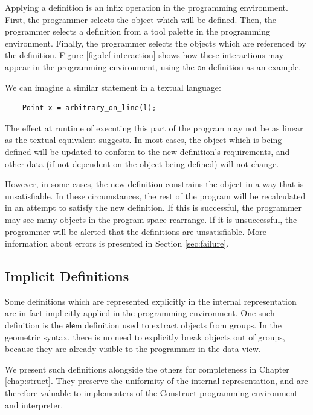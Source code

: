 \documentclass[twoside,11pt]{report}
\begin{document}
Applying a definition is an infix operation in the programming environment. 
First, the programmer selects the object which will be defined. 
Then, the programmer selects a definition from a tool palette in the programming environment. 
Finally, the programmer selects the objects which are referenced by the definition.
Figure \ref{fig:def-interaction} shows how these interactions may appear in the programming environment, using the $\mathsf{on}$ definition as an example.

We can imagine a similar statement in a textual language:

\begin{verbatim}
    Point x = arbitrary_on_line(l);
\end{verbatim}

The effect at runtime of executing this part of the program may not be as linear as the textual equivalent suggests.
In most cases, the object which is being defined will be updated to conform to the new definition's requirements, and other data (if not dependent on the object being defined) will not change.

However, in some cases, the new definition constrains the object in a way that is unsatisfiable. 
In these circumstances, the rest of the program will be recalculated in an attempt to satisfy the new definition. 
If this is successful, the programmer may see many objects in the program space rearrange. 
If it is unsuccessful, the programmer will be alerted that the definitions are unsatisfiable.
More information about errors is presented in Section \ref{sec:failure}.

\subsection{Implicit Definitions}
\label{subsec:implicit-def}

Some definitions which are represented explicitly in the internal representation are in fact implicitly applied in the programming environment.
One such definition is the $\mathsf{elem}$ definition used to extract objects from groups. 
In the geometric syntax, there is no need to explicitly break objects out of groups, because they are already visible to the programmer in the data view.

We present such definitions alongside the others for completeness in Chapter \ref{chap:struct}.
They preserve the uniformity of the internal representation, and are therefore valuable to implementers of the Construct programming environment and interpreter.
\end{document}
